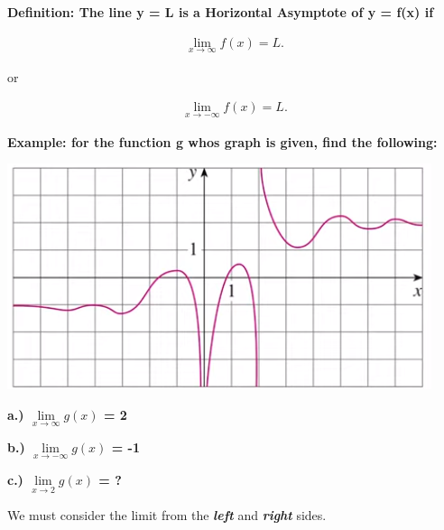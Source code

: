 \documentclass{report}
\begin{document}
        \bigbreak \noindent \bigbreak \noindent 
        \begin{large}
            \textbf{Definition: The line y = L is a Horizontal Asymptote of y = f(x) if}
        \end{large}

        \begin{align*}
            \lim\limits_{x \to \infty}{f(x)} = L
        .\end{align*}

        \bigbreak \noindent 
        \begin{center}
            or
        \end{center}

        \begin{align*}
            \lim\limits_{x \to - \infty}{f(x) = L}
        .\end{align*}


        \bigbreak \noindent \bigbreak \noindent 
        \begin{large}
            \textbf{Example: for the function g whos graph is given, find the following:}
        \end{large}

        \bigbreak \noindent \bigbreak \noindent 
        \begin{center}
            \includegraphics[scale=0.55]{../images/12.png}
        \end{center}

        \pagebreak \bigbreak \noindent
        \textbf{a.) $\lim\limits_{x \to \infty}{g(x)}$ = 2 }

        \bigbreak \noindent 
        \textbf{b.) $\lim\limits_{x \to - \infty}{g(x)}$ = -1}

        \bigbreak \noindent 
        \textbf{c.) $\lim\limits_{x \to 2}{g(x)}$ = ? }

        \bigbreak \noindent 
        We must consider the limit from the \textbf{\textit{left}} and \textbf{\textit{right}} sides.
\end{document}
